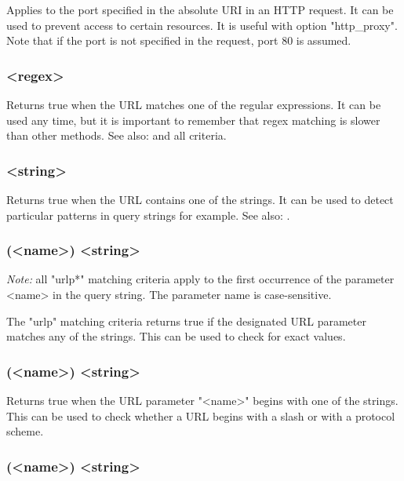   Applies to the port specified in the absolute URI in an HTTP request. It can
  be used to prevent access to certain resources. It is useful with option
  "http\_proxy". Note that if the port is not specified in the request, port 80
  is assumed.

\subsubsection[url\_reg]{ <regex>}

  Returns true when the URL matches one of the regular expressions. It can be
  used any time, but it is important to remember that regex matching is slower
  than other methods. See also:  and all  criteria.

\subsubsection[url\_sub]{ <string>}

  Returns true when the URL contains one of the strings. It can be used to
  detect particular patterns in query strings for example. See also: .

\subsubsection[urlp]{(<name>) <string>}

  \emph{Note:} all "urlp*" matching criteria apply to the first occurrence of the
  parameter <name> in the query string. The parameter name is case-sensitive.

  The "urlp" matching criteria returns true if the designated URL parameter
  matches any of the strings. This can be used to check for exact values.

\subsubsection[urlp\_beg]{(<name>) <string>}

  Returns true when the URL parameter "<name>" begins with one of the strings.
  This can be used to check whether a URL begins with a slash or with a
  protocol scheme.

\subsubsection[urlp\_dir]{(<name>) <string>}

